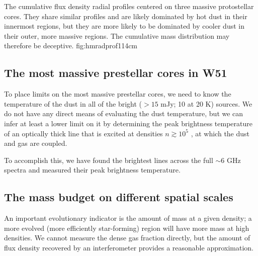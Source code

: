\documentclass{aa}
\begin{document}
{The cumulative flux density radial profiles centered on three
massive protostellar cores.  They share similar profiles and
are likely dominated by hot dust in their innermost regions,
but they are more likely to be dominated by cooler dust in their
outer, more massive regions.  The cumulative mass distribution may
therefore be deceptive.}
{fig:hmradprof}{1}{14cm}

\subsection{The most massive prestellar cores in W51}
To place limits on the most massive prestellar cores, we need to know the
temperature of the dust in all of the bright ($>15$ mJy; 10 \msun at 20 K)
sources.  We do not have any direct means of evaluating the dust temperature,
but we can infer at
least a lower limit on it by determining the peak brightness temperature of an
optically thick line that is excited at densities $n\gtrsim10^5$ \percc, at
which the dust and gas are coupled.

To accomplish this, we have found the brightest lines across the full $\sim6$
GHz spectra and measured their peak brightness temperature.


\subsection{The mass budget on different spatial scales}
\label{sec:massbudget}
An important evolutionary indicator is the amount of mass at a given density; a
more evolved (more efficiently star-forming) region will have more mass at high
densities.  We cannot measure the dense gas fraction directly, but the amount of
flux density recovered by an interferometer provides a reasonable approximation.
\end{document}
